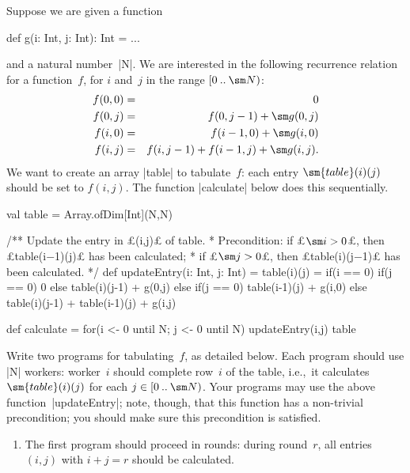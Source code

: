 \begin{question}
\label{ex:recurrence}
Suppose we are given a function
\begin{scala}
  def g(i: Int, j: Int): Int = ...
\end{scala}
%
and a natural number~|N|.  We are interested in the following recurrence
relation for a function~$f$, for $i$ and~$j$ in the range $\interval 0 {\sm
  N}$:
%
\begin{eqnarray*}
f(0,0) & = & 0 \\
f(0,j) & = & f(0,j-1) + \sm g(0,j) \\
f(i,0) & = & f(i-1,0) + \sm g(i,0) \\
f(i,j) & = & f(i,j-1) + f(i-1,j) + \sm g(i,j).
\end{eqnarray*}
%
We want to create an array |table| to tabulate~$f$: each entry
$\sm{table}(i)(j)$ should be set to $f(i,j)$.  The function |calculate| below
does this sequentially.


\begin{scala}
  val table = Array.ofDim[Int](N,N)

  /** Update the entry in £(i,j)£ of table.  
    * Precondition: if £$\sm i > 0$£, then £table(i$-$1)(j)£ has been calculated; 
    *      if £$\sm j > 0$£, then £table(i)(j$-$1)£ has been calculated. */
  def updateEntry(i: Int, j: Int) = {
    table(i)(j) = 
      if(i == 0){ if(j == 0) 0 else table(i)(j-1) + g(0,j) }
      else if(j == 0) table(i-1)(j) + g(i,0) 
      else table(i)(j-1) + table(i-1)(j) + g(i,j)
  }

  def calculate = {
    for(i <- 0 until N; j <- 0 until N) updateEntry(i,j)
    table
  }
\end{scala}


Write two programs for tabulating~$f$, as detailed below.  Each program should
use |N| workers: worker~$i$ should complete row~$i$ of the table, i.e.,~it 
calculates $\sm{table}(i)(j)$ for each $j \in \interval 0 {\sm N}$.
Your programs may use the above function~|updateEntry|; note, though, that this
function has a non-trivial precondition; you should make sure this
precondition is satisfied.  
%
\begin{enumerate}
\item The first program should proceed in rounds: during round~$r$, all
  entries $(i,j)$ with $i+j = r$ should be calculated.


\end{enumerate}
\end{question}
